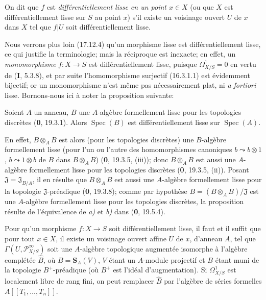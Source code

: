 On dit que $f$ est \emph{différentiellement lisse en un point $x\in X$} (ou
que $X$ est différentiellement lisse sur $S$ au point $x$) s'il existe un
voisinage ouvert $U$ de $x$ dans $X$ tel que $f|U$ soit différentiellement
lisse.

Nous verrons plus loin (17.12.4) qu'un morphisme lisse est différentiellement
lisse, ce qui justifie la terminologie; mais la réciproque est inexacte; en
effet, un \emph{monomorphisme} $f:X\to S$ est différentiellement lisse,
puisque $\varOmega_{X/S}^1=0$ en vertu de (\textbf{I}, 5.3.8), et par suite
l'homomorphisme surjectif (16.3.1.1) est évidemment bijectif; or un
monomorphisme n'est même pas nécessairement plat, ni \emph{a fortiori} lisse.
Bornons-nous ici à noter la proposition suivante:

\begin{proposition}[16.10.2]
\label{IV.16.10.2}
Soient $A$ un anneau, $B$ une $A$-algèbre formellement lisse pour les
topologies discrètes \textup{(\textbf{0}, 19.3.1)}. Alors $\operatorname{Spec}(B)$ est
différentiellement lisse sur $\operatorname{Spec}(A)$.
\end{proposition}

En effet, $B\otimes_A B$ est alors (pour les topologies discrètes) une
$B$-algèbre formellement lisse (pour l'un ou l'autre des homomorphismes
canoniques $b\leadsto b\otimes1$, $b\leadsto1\otimes b$ de $B$
dans $B\otimes_A B$) (\textbf{0}, 19.3.5, (iii)); donc $B\otimes_A B$ est aussi une
$A$-algèbre formellement lisse pour les topologies discrètes (\textbf{0}, 19.3.5,
(ii)). Posant $\mathfrak{J}=\mathfrak{J}_{B/A}$, il en résulte que
$B\otimes_A B$ est aussi une $A$-algèbre formellement lisse pour la topologie
$\mathfrak{J}$-préadique (\textbf{0}, 19.3.8); comme par hypothèse
$B=(B\otimes_A B)/\mathfrak{J}$ est une $A$-algèbre formellement lisse pour
les topologies discrètes, la proposition résulte de l'équivalence de \emph{a)} et \emph{b)}
dans (\textbf{0}, 19.5.4).

\begin{proposition}[16.10.3]
\label{IV.16.10.3}
Pour qu'un morphisme $f:X\to S$ soit différentiellement lisse, il faut et il
suffit que pour tout $x\in X$, il existe un voisinage ouvert affine $U$ de
$x$, d'anneau $A$, tel que $\Gamma(U,\mathscr{P}_{X/S}^{\infty})$ soit une
$A$-algèbre topologique augmentée isomorphe à l'algèbre complétée $\widehat B$,
où $B=\mathbf{S}_A(V)$, $V$ étant un $A$-module projectif et $B$ étant muni de
la topologie $B^+$-préadique (où $B^+$ est l'idéal d'augmentation). Si
$\varOmega_{X/S}^1$ est localement libre de rang fini, on peut remplacer
$\widehat B$ par l'algèbre de séries formelles $A[[T_1,\ldots,T_n]]$.
\end{proposition}

